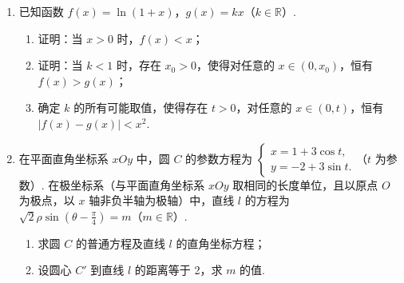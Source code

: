 \begin{description}
\begin{enumerate}[leftmargin=5pt]
        \item 已知函数 \(f(x) = \ln (1 + x)\)，\(g(x) = kx\)（\(k \in \mathbb{R}\)）.
\begin{enumerate}
\item 证明：当 \(x > 0\) 时，\(f(x) < x\)；
\item 证明：当 \(k < 1\) 时，存在 \(x_0 > 0\)，使得对任意的 \(x \in (0, x_0)\)，恒有 \(f(x) > g(x)\)；
\item 确定 \(k\) 的所有可能取值，使得存在 \(t > 0\)，对任意的 \(x \in (0, t)\)，恒有 \(|f(x) - g(x)| < x^2\).
\end{enumerate}

        \item 在平面直角坐标系 \(xOy\) 中，圆 \(C\) 的参数方程为 \(\begin{cases}
x = 1 + 3\cos t,\\
y = -2 + 3\sin t.
\end{cases}\)（\(t\) 为参数）. 在极坐标系（与平面直角坐标系 \(xOy\) 取相同的长度单位，且以原点 \(O\) 为极点，以 \(x\) 轴非负半轴为极轴）中，直线 \(l\) 的方程为 \(\sqrt{2}\rho\sin \left(\theta - \frac{\pi}{4}\right) = m\)（\(m \in \mathbb{R}\)）.
\begin{enumerate}
\item 求圆 \(C\) 的普通方程及直线 \(l\) 的直角坐标方程；
\item 设圆心 \(C'\) 到直线 \(l\) 的距离等于 2，求 \(m\) 的值.
\end{enumerate}

    \end{enumerate}

\end{description}

